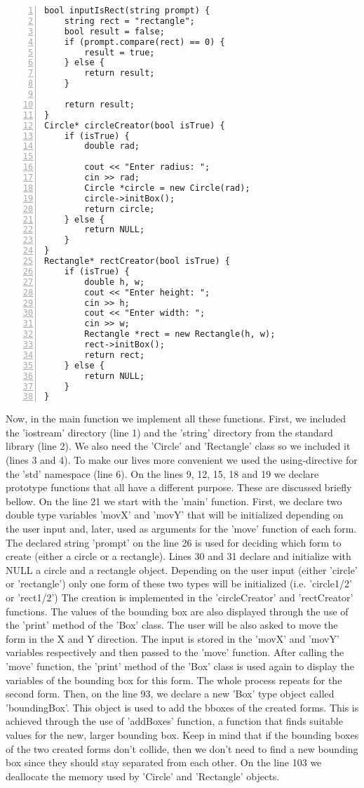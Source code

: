 \documentclass{article}
\begin{document}
\begin{lstlisting}[basicstyle=\footnotesize\ttfamily, numbers=left, stepnumber=1, numberstyle = \normalsize, caption={My Caption}]
bool inputIsRect(string prompt) {
	string rect = "rectangle";
	bool result = false;
	if (prompt.compare(rect) == 0) {
		result = true;
	} else {
		return result;
	}

	return result;
}
Circle* circleCreator(bool isTrue) {
	if (isTrue) {
		double rad;

		cout << "Enter radius: ";
		cin >> rad;
		Circle *circle = new Circle(rad);
		circle->initBox();
		return circle;
	} else {
		return NULL;
	}
}
Rectangle* rectCreator(bool isTrue) {
	if (isTrue) {
		double h, w;
		cout << "Enter height: ";
		cin >> h;
		cout << "Enter width: ";
		cin >> w;
		Rectangle *rect = new Rectangle(h, w);
		rect->initBox();
		return rect;
	} else {
		return NULL;
	}
}
\end{lstlisting}
\normalsize{
Now, in the main function we implement all these functions. First, we included the 'iostream' directory (line 1) and the 'string' directory from the standard library (line 2).
We also need the 'Circle' and 'Rectangle' class so we included it (lines 3 and 4). To make our lives more convenient we used the using-directive for the 'std' namespace (line 6).
On the lines 9, 12, 15, 18 and 19 we declare prototype functions that all have a different purpose. These are discussed briefly bellow.
On the line 21 we start with the 'main' function. First, we declare two double type variables 'movX' and 'movY' that will be initialized depending on the user input and, later, used as arguments for the 'move' function of each form.
The declared string 'prompt' on the line 26 is used for deciding which form to create (either a circle or a rectangle).
Lines 30 and 31 declare and initialize with NULL a circle and a rectangle object.
Depending on the user input (either 'circle' or 'rectangle') only one form of these two types will be initialized (i.e. 'circle1/2' or 'rect1/2')
The creation is implemented in the 'circleCreator' and 'rectCreator' functions. The values of the bounding box are also displayed through the use of the 'print' method of the 'Box' class.
The user will be also asked to move the form in the X and Y direction. The input is stored in the 'movX' and 'movY' variables respectively and then passed to the 'move' function.
After calling the 'move' function, the 'print' method of the 'Box' class is used again to display the variables of the bounding box for this form.
The whole process repeats for the second form.
Then, on the line 93, we declare a new 'Box' type object called 'boundingBox'. This object is used to add the bboxes of the created forms. This is achieved through the use of 'addBoxes' function, a function that finds suitable values for the new, larger bounding box. Keep in mind that if the bounding boxes of the two created forms don't collide, then we don't need to find a new bounding box since they should stay separated from each other.
On the line 103 we deallocate the memory used by 'Circle' and 'Rectangle' objects.
\newline
}
\end{document}
